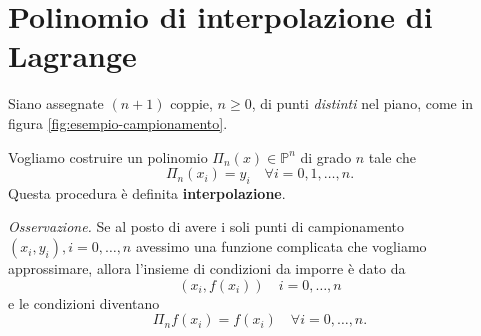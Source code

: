 \section{Polinomio di interpolazione di Lagrange}
Siano assegnate $( n+1)$ coppie, $n\geqslant 0$, di punti \textit{distinti} nel piano, come in figura \ref{fig:esempio-campionamento}.

Vogliamo costruire un polinomio $\Pi _{n}(x) \in \mathbb{P}^{n}$ di grado $n$ tale che
\begin{equation*}
\Pi _{n}( x_{i}) =y_{i} \quad\forall i=0,1,\dotsc ,n.
\end{equation*}
Questa procedura è definita \textbf{interpolazione}.

\textit{Osservazione.} Se al posto di avere i soli punti di campionamento $( x_{i} ,y_{i}), i=0,\dotsc ,n$ avessimo una funzione complicata che vogliamo approssimare, allora l'insieme di condizioni da imporre è dato da
\begin{equation*}
( x_{i} ,f( x_{i})) \quad i=0,\dotsc ,n
\end{equation*}
e le condizioni diventano
\begin{equation*}
\Pi _{n} f(x_{i}) =f( x_{i}) \quad\forall i=0,\dotsc ,n.
\end{equation*}
